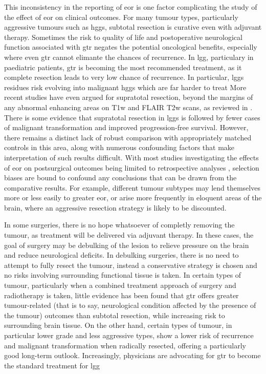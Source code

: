 This inconsistency in the reporting of \gls{eor} is one factor complicating the study of the effect of \gls{eor} on clinical outcomes.
For many tumour types, particularly aggressive tumours such as \glspl{hgg}, subtotal resection is  curative even with adjuvant therapy.
Sometimes the risk to quality of life and postoperative neurological function associated with \gls{gtr} negates the potential oncological benefits, especially where even \gls{gtr} cannot elimante the chances of recurrence.
In \gls{lgg}, particulary in paediatric patients, \gls{gtr} is becoming the most recommended treatment, as it complete resection leads to very low chance of recurrence.
In particular, \glspl{lgg} residues risk evolving into malignant \glspl{hgg} which are far harder to treat
More recent studies have even argued for supratotal resection, beyond the margins of any abnormal enhancing areas on T1w and FLAIR T2w scans, as reviewed in \textcite{deLeeuw2019}.
There is some evidence \autocite{Yordanova2011} that supratotal resection in \glspl{lgg} is followed by fewer cases of malignant transformation and improved progression-free survival.
However, there remains a distinct lack of robust comparison with appropriately matched controls in this area, along with numerous confounding factors that make interpretation of such results difficult.
With most studies investigating the effects of \gls{eor} on postsurgical outcomes being limited to retrospective analyses , selection biases are bound to confound any conclusions that can be drawn from the comparative results.\autocite{deLeeuw2019,Keles2001}
For example, different tumour subtypes may lend themselves more or less easily to greater \gls{eor}, or arise more frequently in eloquent areas of the brain, where an aggressive resection strategy is likely to be discounted.\autocite{deLeeuw2019}

In some surgeries, there is no hope whatsoever of completly removing the tumour, as treatment will be delivered via adjuvant therapy.
In these cases, the goal of surgery may be debulking of the lesion to relieve pressure on the brain and reduce neurological deficits.
In debulking surgeries, there is no need to attempt to fully resect the tumour, instead a conservative strategy is chosen and no risks involving surrounding functional tissue is taken.
In certain types of tumour, particularly when a combined treatment approach of surgery and radiotherapy is taken, little evidence has been found that \gls{gtr} offers greater tumour-related (that is to say, neurological condition affected by the presence of the tumour) outcomes than subtotal resection, while increasing risk to surrounding brain tissue.
On the other hand, certain types of tumour, in particular lower grade and less aggressive types, show a lower risk of recurrence and malignant transformation when radically resected, offering a particularly good long-term outlook.
Increasingly, physicians are advocating for \gls{gtr} to become the standard treatment for \gls{lgg} 

